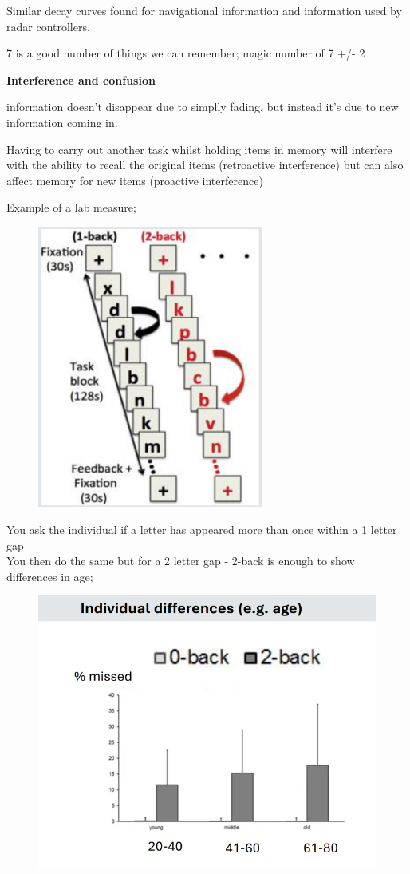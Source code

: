 \documentclass[]{project_plan}
\begin{document}
Similar decay curves found for navigational information and information
used by radar controllers.

7 is a good number of things we can remember; magic number of 7 +/- 2

\textbf{Interference and confusion}

information doesn't disappear due to simplly fading, but instead it's due
to new information coming in.

Having to carry out another task whilst holding items in memory will interfere with
the ability to recall the original items (retroactive interference) but can also
affect memory for new items (proactive interference)

\newpage

Example of a lab measure;
\begin{figure}[h!]
  \centering
  \includegraphics[width=20em]{1_back_2_back_lab_measure.png}
\end{figure}
You ask the individual if a letter has appeared more than once within a 1 letter gap\\
You then do the same but for a 2 letter gap - 2-back is enough to show differences in age;
\begin{figure}[h!]
  \centering
  \includegraphics[width=\linewidth]{working_memory_1_back_age_differences.png}
\end{figure}
\end{document}
